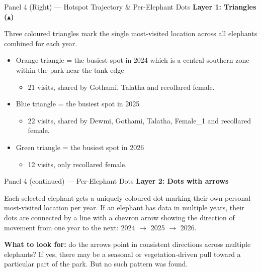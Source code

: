\documentclass{beamer}
\begin{document}
	
	
	
	
	
	
	\begin{frame}{Panel 4 (Right) --- Hotspot Trajectory \& Per-Elephant Dots}
		\textbf{Layer 1: Triangles ($\blacktriangle$)}
		
		Three coloured triangles mark the single most-visited location across all
		elephants combined for each year.
		\begin{itemize}
			\item Orange triangle = the busiest spot in 2024 which is a central-southern
			zone within the park near the tank edge
			\begin{itemize}
				\item 21 visits, shared by Gothami, Talatha and recollared female.
			\end{itemize}
			\item Blue triangle = the busiest spot in 2025
			\begin{itemize}
				\item 22 visits, shared by Dewmi,
				Gothami, Talatha, Female\_1 and recollared female.
			\end{itemize}
			\item Green triangle = the busiest spot in 2026
			\begin{itemize}
				\item 12 visits, only recollared female.
			\end{itemize}
		\end{itemize}
	\end{frame}
	
	
	
	
	
	
	
	\begin{frame}{Panel 4 (continued) --- Per-Elephant Dots}
		\textbf{Layer 2: Dots with arrows}
		
		Each selected elephant gets a uniquely coloured dot marking their own
		personal most-visited location per year. If an elephant has data in multiple
		years, their dots are connected by a line with a chevron arrow showing the
		direction of movement from one year to the next: 2024 $\rightarrow$ 2025
		$\rightarrow$ 2026.
		
		\vspace{6pt}
		\textbf{What to look for:} do the arrows point in consistent directions
		across multiple elephants? If yes, there may be a seasonal or
		vegetation-driven pull toward a particular part of the park. But no such pattern
		was found.
	\end{frame}
	
\end{document}
